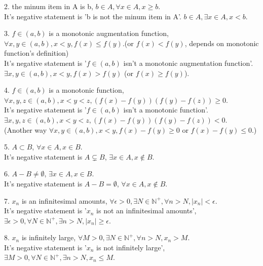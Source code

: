  	2. the minum item in A is b, $ b\in A,\forall x\in A, x\ge b $.\\
 	It's negative statement is 'b is not the minum item in A'. $ b\in A, \exists x\in A, x< b $.
 	
 	3. $ f\in (a,b) $ is a monotonic augmentation function, $ \forall x,y \in (a,b), x<y, f(x)\leqslant f(y) $.(or $ f(x) < f(y) $, depends on monotonic function's definition)\\
 	It's negative statement is '$ f\in (a,b) $ isn't a monotonic augmentation function'. $ \exists x,y \in (a,b), x<y, f(x)>f(y) $ (or $ f(x)\ge f(y) $).
 	
 	4. $ f\in (a,b) $ is a monotonic function, $ \forall x,y,z \in (a,b), x<y<z, (f(x)-f(y))(f(y)-f(z))\ge 0 $.\\
 	It's negative statement is '$ f\in (a,b) $ isn't a monotonic function'. $ \exists x,y,z \in (a,b), x<y<z, (f(x)-f(y))(f(y)-f(z))< 0 $.\\
 	(Another way $ \forall x,y \in (a,b), x<y, f(x)-f(y)\ge 0 \text{ or } f(x)-f(y)\leqslant 0 $.)
 	
 	5. $ A \subset B $, $ \forall x\in A, x\in B $.\\
 	It's negative statement is $ A \subsetneq B $, $ \exists x\in A, x\notin B $.
 	
 	6. $ A-B\neq \emptyset $, $ \exists x\in A, x\in B $.\\
 	It's negative statement is $ A-B = \emptyset $, $ \forall x\in A, x\notin B $.
 	
 	7. {$ x_n $} is an infinitesimal amounts, $ \forall \epsilon >0, \exists N\in \mathbb{N}^+, \forall n>N, |x_n|<\epsilon $.\\
 	It's negative statement is '{$ x_n $} is not an infinitesimal amounts', $ \exists \epsilon >0, \forall N\in \mathbb{N}^+, \exists n>N, |x_n|\ge\epsilon $.
 	
 	8. {$ x_n $} is infinitely large, $ \forall M >0, \exists N\in \mathbb{N}^+, \forall n>N, x_n>M $.\\
 	It's negative statement is '{$ x_n $} is not infinitely large', $ \exists M >0, \forall N\in \mathbb{N}^+, \exists n>N, x_n\leqslant M $.
 	
